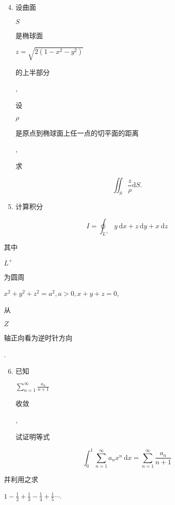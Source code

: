 \documentclass[10pt]{article}
\begin{document}
\begin{enumerate}
  \setcounter{enumi}{3}
  \item \begin{CJK}{UTF8}{mj}设曲面\end{CJK} $S$ \begin{CJK}{UTF8}{mj}是椭球面\end{CJK} $z=\sqrt{2\left(1-x^{2}-y^{2}\right)}$ \begin{CJK}{UTF8}{mj}的上半部分\end{CJK}, \begin{CJK}{UTF8}{mj}设\end{CJK} $\rho$ \begin{CJK}{UTF8}{mj}是原点到椭球面上任一点的切平面的距离\end{CJK}, \begin{CJK}{UTF8}{mj}求\end{CJK}
\end{enumerate}
$$
\iint_{S} \frac{z}{\rho} \mathrm{d} S .
$$

\begin{enumerate}
  \setcounter{enumi}{4}
  \item \begin{CJK}{UTF8}{mj}计算积分\end{CJK}
\end{enumerate}
$$
I=\oint_{L^{+}} y \mathrm{~d} x+z \mathrm{~d} y+x \mathrm{~d} z
$$
\begin{CJK}{UTF8}{mj}其中\end{CJK} $L^{+}$\begin{CJK}{UTF8}{mj}为圆周\end{CJK} $x^{2}+y^{2}+z^{2}=a^{2}, a>0, x+y+z=0$,\begin{CJK}{UTF8}{mj}从\end{CJK} $Z$ \begin{CJK}{UTF8}{mj}轴正向看为逆时针方向\end{CJK}.

\begin{enumerate}
  \setcounter{enumi}{5}
  \item \begin{CJK}{UTF8}{mj}已知\end{CJK} $\sum_{n=1}^{\infty} \frac{a_{n}}{n+1}$ \begin{CJK}{UTF8}{mj}收敛\end{CJK}, \begin{CJK}{UTF8}{mj}试证明等式\end{CJK}
\end{enumerate}
$$
\int_{0}^{1} \sum_{n=1}^{\infty} a_{n} x^{n} \mathrm{~d} x=\sum_{n=1}^{\infty} \frac{a_{n}}{n+1}
$$
\begin{CJK}{UTF8}{mj}并利用之求\end{CJK} $1-\frac{1}{2}+\frac{1}{3}-\frac{1}{4}+\frac{1}{5} \cdots$.
\end{document}
